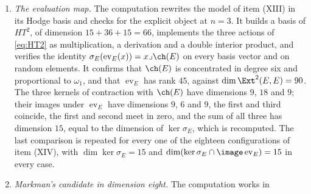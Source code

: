\begin{enumerate}[label=\textup{(\Roman*)},leftmargin=*]
  discussed after . For three classes spanning
  $\NS(A_{0})_{\QQ}$ together with $\eta$, the obstruction map
  $v\mapsto(v\lrcorner\lambda_{i})_{i}$ on $T$ has kernel exactly
  $T_{\mathrm{spl}}$ and rank $n(n-1)/2$. Each of the seven single classes
  $\gamma$, $\ell$, $\gamma+\ell$, $\gamma+2\ell$, $\beta$, $\widehat\beta$,
  $\beta+\ell$ already has $\{v\in T:v\lrcorner\theta=0\}=T_{\mathrm{spl}}$,
  and each of $150$ random rational classes off $\QQ\eta$ is contracted
  nontrivially by some vector of $T$, while $\eta$ and $3\eta$ are contracted
  to zero by all of $T$; this is the mechanism of . For
  the six line bundles of  at $n=3$ the computation
  finds kernel $T_{\mathrm{spl}}$ of dimension $6$ and rank $3$, and checks
  that $\sigma_{E}$ kills the image. It computes the annihilator of
  $\omega_{1}$ in $H^{0,2}$, of dimension $9$, checks that $\sigma_{E}$ kills
  $z\cdot\id_{E}$ for $z$ in it, and finds that the sum of that
  nine-dimensional space and the three-dimensional image has dimension $12$.
  Finally it recomputes the kernel of $\sigma_{E}$ as $15$, and checks that
  the components of every obstruction vector on $L_{i}$ and on
  $L_{i}^{-1}[3]$ are negatives of each other.
\item \emph{The evaluation map.} The computation rewrites the model of item
  (XIII) in its Hodge basis and checks  for the
  explicit object at $n=3$. It builds a basis of $HT^{2}$, of dimension
  $15+36+15=66$, implements the three actions of \eqref{eq:HT2} as
  multiplication, a derivation and a double interior product, and verifies
  the identity $\sigma_{E}(\operatorname{ev}_{E}(x))=x\lrcorner\ch(E)$ on
  every basis vector and on random elements. It confirms that $\ch(E)$ is
  concentrated in degree six and proportional to $\omega_{1}$, and that
  $\operatorname{ev}_{E}$ has rank $45$, against $\dim\Ext^{2}(E,E)=90$. The
  three kernels of contraction with $\ch(E)$ have dimensions $9$, $18$ and
  $9$; their images under $\operatorname{ev}_{E}$ have dimensions $9$, $6$
  and $9$, the first and third coincide, the first and second meet in zero,
  and the sum of all three has dimension $15$, equal to the dimension of
  $\ker\sigma_{E}$, which is recomputed. The last comparison is repeated for
  every one of the eighteen configurations of item (XIV), with
  $\dim\ker\sigma_{E}=15$ and
  $\dim(\ker\sigma_{E}\cap\image\operatorname{ev}_{E})=15$ in every case.
\item \emph{Markman's candidate in dimension eight.} The computation works in

\end{enumerate}
